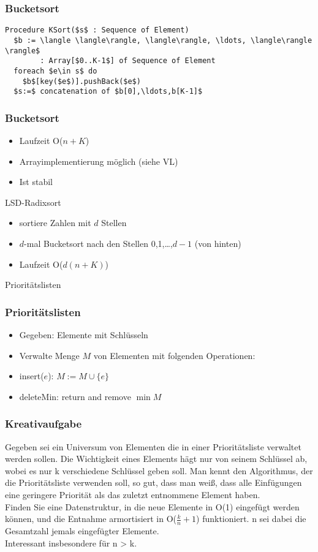 \begin{frame}[fragile]
\frametitle{Bucketsort}
\begin{lstlisting}
Procedure KSort($s$ : Sequence of Element)
  $b := \langle \langle\rangle, \langle\rangle, \ldots, \langle\rangle \rangle$
        : Array[$0..K-1$] of Sequence of Element
  foreach $e\in s$ do
    $b$[key($e$)].pushBack($e$)
  $s:=$ concatenation of $b[0],\ldots,b[K-1]$
\end{lstlisting}
\end{frame}

\begin{frame}
\frametitle{Bucketsort}
\begin{itemize}
\item Laufzeit O($n+K$)
\item Arrayimplementierung möglich (siehe VL)
\item Ist stabil 
\end{itemize}\pause
LSD-Radixsort
\begin{itemize}
\item sortiere Zahlen mit $d$ Stellen
\item $d$-mal Bucketsort nach den Stellen 0,1,\ldots,$d-1$ (von hinten)
\item Laufzeit O($d(n+K)$)
\end{itemize}
\end{frame}

\begin{frame}
Prioritätslisten
\end{frame}

\begin{frame}
\frametitle{Prioritätslisten}
\begin{itemize}
\item Gegeben: Elemente mit Schlüsseln 
\item Verwalte Menge $M$ von Elementen mit folgenden Operationen:\pause
\item insert($e$): $M:=M\cup\{e\}$
\item deleteMin: return and remove $\min M$
\end{itemize}
\end{frame}

\begin{frame}
\frametitle{Kreativaufgabe}
Gegeben sei ein Universum von Elementen die in einer Prioritätsliste verwaltet werden sollen. Die Wichtigkeit eines Elements hägt nur von seinem Schlüssel ab, wobei es nur k verschiedene Schlüssel geben soll. Man kennt den Algorithmus, der die Prioritätsliste verwenden soll, so gut, dass man weiß, dass alle Einfügungen eine geringere Priorität als das zuletzt entnommene Element haben.\\
Finden Sie eine Datenstruktur, in die neue Elemente in O(1) eingefügt werden können, und die Entnahme armortisiert in O($\frac{k}{n}+1$) funktioniert. n sei dabei die Gesamtzahl jemals eingefügter Elemente.\\
Interessant insbesondere für n > k.
\end{frame}

